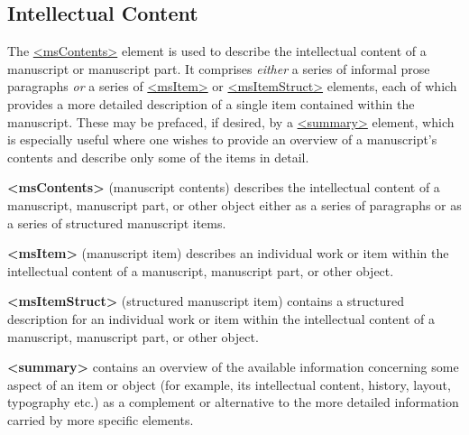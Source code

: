 \subsection[{Intellectual Content}]{Intellectual Content}\label{msco}\par
The \hyperref[TEI.msContents]{<msContents>} element is used to describe the intellectual content of a manuscript or manuscript part. It comprises \textit{either} a series of informal prose paragraphs \textit{or} a series of \hyperref[TEI.msItem]{<msItem>} or \hyperref[TEI.msItemStruct]{<msItemStruct>} elements, each of which provides a more detailed description of a single item contained within the manuscript. These may be prefaced, if desired, by a \hyperref[TEI.summary]{<summary>} element, which is especially useful where one wishes to provide an overview of a manuscript's contents and describe only some of the items in detail. 
\begin{sansreflist}
  
\item [\textbf{<msContents>}] (manuscript contents) describes the intellectual content of a manuscript, manuscript part, or other object either as a series of paragraphs or as a series of structured manuscript items.
\item [\textbf{<msItem>}] (manuscript item) describes an individual work or item within the intellectual content of a manuscript, manuscript part, or other object.
\item [\textbf{<msItemStruct>}] (structured manuscript item) contains a structured description for an individual work or item within the intellectual content of a manuscript, manuscript part, or other object.
\item [\textbf{<summary>}] contains an overview of the available information concerning some aspect of an item or object (for example, its intellectual content, history, layout, typography etc.) as a complement or alternative to the more detailed information carried by more specific elements.
\end{sansreflist}
\par
